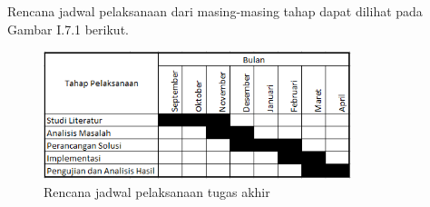 Rencana jadwal pelaksanaan dari masing-masing tahap dapat dilihat pada Gambar I.7.1 berikut.

\begin{figure}[h]
    \centering
    \includegraphics[width=0.8\textwidth]{resources/chapter-1-gantt-chart.png}
    \caption{Rencana jadwal pelaksanaan tugas akhir}
\end{figure}